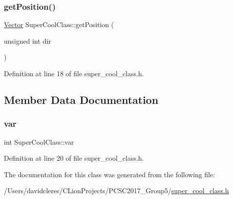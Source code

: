 \subsubsection{\texorpdfstring{get\+Position()}{getPosition()}}
{\footnotesize\ttfamily \mbox{\hyperlink{struct_vector}{Vector}} Super\+Cool\+Class\+::get\+Position (\begin{DoxyParamCaption}\item[{unsigned int}]{dir }\end{DoxyParamCaption})\hspace{0.3cm}{\ttfamily [inline]}}



Definition at line 18 of file super\+\_\+cool\+\_\+class.\+h.



\subsection{Member Data Documentation}
\mbox{\label{class_super_cool_class_a0264bf7dc5bfe0057907102b2b5b767d}} 
\subsubsection{\texorpdfstring{var}{var}}
{\footnotesize\ttfamily int Super\+Cool\+Class\+::var\hspace{0.3cm}{\ttfamily [protected]}}



Definition at line 20 of file super\+\_\+cool\+\_\+class.\+h.



The documentation for this class was generated from the following file\+:\begin{DoxyCompactItemize}
\item 
/\+Users/davidcleres/\+C\+Lion\+Projects/\+P\+C\+S\+C2017\+\_\+\+Group5/\mbox{\hyperlink{super__cool__class_8h}{super\+\_\+cool\+\_\+class.\+h}}\end{DoxyCompactItemize}
